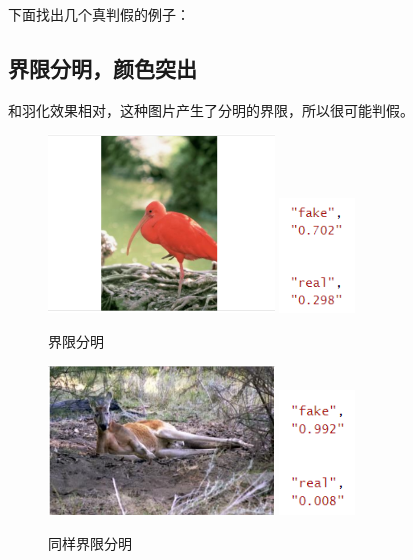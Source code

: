 \documentclass[boldfont,linespread=1.35]{ctexart}
\begin{document}
下面找出几个真判假的例子：
\subsection{界限分明，颜色突出}
和羽化效果相对，这种图片产生了分明的界限，所以很可能判假。
\begin{figure}[h]
	\centering
	{\includegraphics[width=6cm]{9}}
	{\includegraphics[width=2cm]{10}}
	\color{gray}\caption{界限分明}
\end{figure}

\begin{figure}[h]
	\centering
	{\includegraphics[width=6cm]{12}}
	{\includegraphics[width=2cm]{13}}
	\color{gray}\caption{同样界限分明}
\end{figure}

\newpage
\end{document}
